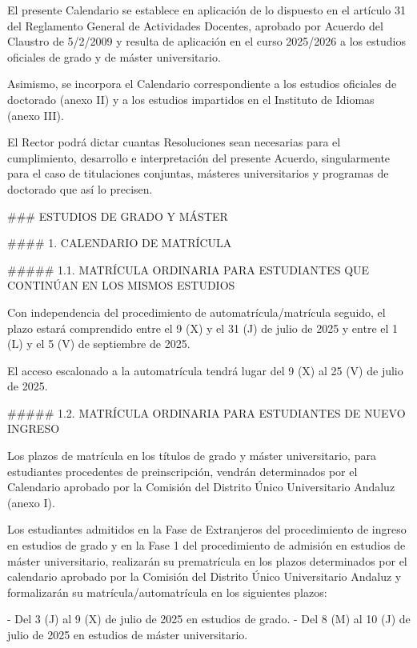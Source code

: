 \documentclass{article}
\begin{document}
\begin{itemize}
\begin{itemize}
\begin{scriptsize}
                  El presente Calendario se establece en aplicación de lo dispuesto en el artículo 31 del Reglamento General de Actividades Docentes, aprobado por Acuerdo del Claustro de 5/2/2009 y resulta de aplicación en el curso 2025/2026 a los estudios oficiales de grado y de máster universitario.

                  Asimismo, se incorpora el Calendario correspondiente a los estudios oficiales de doctorado (anexo II) y a los estudios impartidos en el Instituto de Idiomas (anexo III).

                  El Rector podrá dictar cuantas Resoluciones sean necesarias para el cumplimiento, desarrollo e interpretación del presente Acuerdo, singularmente para el caso de titulaciones conjuntas, másteres universitarios y programas de doctorado que así lo precisen.

                  \#\#\# ESTUDIOS DE GRADO Y MÁSTER

                  \#\#\#\# 1. CALENDARIO DE MATRÍCULA

                  \#\#\#\#\# 1.1. MATRÍCULA ORDINARIA PARA ESTUDIANTES QUE CONTINÚAN EN LOS MISMOS ESTUDIOS

                  Con independencia del procedimiento de automatrícula/matrícula seguido, el plazo estará comprendido entre el 9 (X) y el 31 (J) de julio de 2025 y entre el 1 (L) y el 5 (V) de septiembre de 2025.

                  El acceso escalonado a la automatrícula tendrá lugar del 9 (X) al 25 (V) de julio de 2025.

                  \#\#\#\#\# 1.2. MATRÍCULA ORDINARIA PARA ESTUDIANTES DE NUEVO INGRESO

                  Los plazos de matrícula en los títulos de grado y máster universitario, para estudiantes procedentes de preinscripción, vendrán determinados por el Calendario aprobado por la Comisión del Distrito Único Universitario Andaluz (anexo I).

                  Los estudiantes admitidos en la Fase de Extranjeros del procedimiento de ingreso en estudios de grado y en la Fase 1 del procedimiento de admisión en estudios de máster universitario, realizarán su prematrícula en los plazos determinados por el calendario aprobado por la Comisión del Distrito Único Universitario Andaluz y formalizarán su matrícula/automatrícula en los siguientes plazos:

                  - Del 3 (J) al 9 (X) de julio de 2025 en estudios de grado.
                  - Del 8 (M) al 10 (J) de julio de 2025 en estudios de máster universitario.


\end{scriptsize}
\end{itemize}
\end{itemize}
\end{document}

